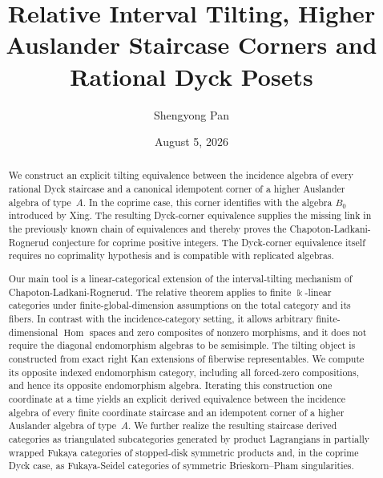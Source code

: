 \documentclass[12pt,a4paper,english,reqno]{amsart}
\title[Relative interval tilting and Dyck posets]
{Relative Interval Tilting, Higher Auslander Staircase Corners and Rational Dyck Posets}
\author{Shengyong Pan}
\date{August 5, 2026}
\theoremstyle{plain}
\theoremstyle{definition}
\newcommand{\kk}{\Bbbk}
\newcommand{\Hom}{\operatorname{Hom}}
\begin{document}
\begin{abstract}
We construct an explicit tilting equivalence between the incidence algebra of
every rational Dyck staircase and a canonical idempotent corner of a higher
Auslander algebra of type~$A$. In the coprime case, this corner identifies
with the algebra $B_0$ introduced by Xing. The resulting Dyck-corner
equivalence supplies the missing link in the previously known chain of
equivalences and thereby proves the Chapoton-Ladkani-Rognerud conjecture
for coprime positive integers. The Dyck-corner equivalence itself requires
no coprimality hypothesis and is compatible with replicated algebras.

Our main tool is a linear-categorical extension of the interval-tilting
mechanism of Chapoton-Ladkani-Rognerud. The relative theorem applies to
finite $\kk$-linear categories under finite-global-dimension assumptions on
the total category and its fibers. In contrast with the incidence-category
setting, it allows arbitrary finite-dimensional $\Hom$ spaces and zero
composites of nonzero morphisms, and it does not require the diagonal
endomorphism algebras to be semisimple. The tilting object is constructed
from exact right Kan extensions of fiberwise representables. We compute its
opposite indexed endomorphism category, including all forced-zero
compositions, and hence its opposite endomorphism algebra. Iterating this
construction one coordinate at a time yields an explicit derived
equivalence between the incidence algebra of every finite coordinate
staircase and an idempotent corner of a higher Auslander algebra of type~$A$.
We further realize the resulting staircase derived categories as
triangulated subcategories generated by product Lagrangians in partially
wrapped Fukaya categories of stopped-disk symmetric products and, in the
coprime Dyck case, as Fukaya-Seidel categories of symmetric
Brieskorn--Pham singularities.

\end{abstract}

\address{School of Mathematics and Statistics, Beijing Jiaotong University,
Beijing, 100044, China.}
\address{Beijing Key Laboratory of Biological Big Data and Topological Statistics, Beijing Jiaotong University,
Beijing, 100044, China.}
\maketitle
\end{document}
